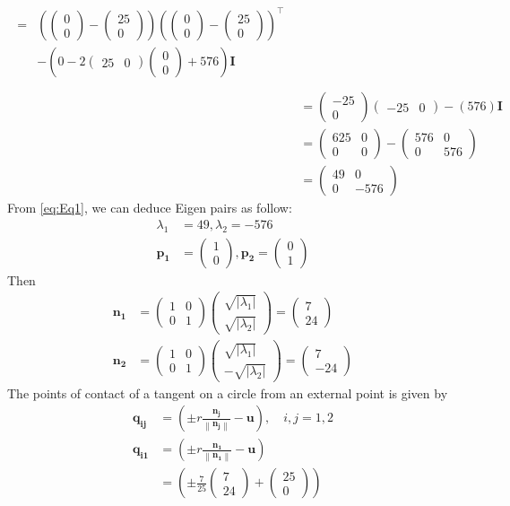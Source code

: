 \documentclass[12pt]{article}
\providecommand{\brak}[1]{\ensuremath{\left(#1\right)}}
\providecommand{\norm}[1]{\left\lVert#1\right\rVert}
\providecommand{\abs}[1]{\left\vert#1\right\vert}
\newcommand{\myvec}[1]{\ensuremath{\begin{pmatrix}#1\end{pmatrix}}}
\let\vec\mathbf
\begin{document}
\begin{enumerate}
\begin{align}
\end{align}
\begin{align}
  \begin{split}
	={}& \brak{\myvec{0\\0}-\myvec{25\\0}}\brak{\myvec{0\\0}-\myvec{25\\0}}^\top \\
	   & -\brak{0-2\myvec{25&0}\myvec{0 \\0}+576}\vec{I}\\ 
  \end{split}\\
	&= \myvec{-25\\0}\myvec{-25&0} - \brak{576}\vec{I} \\ 
	&= \myvec{625&0\\0&0 } - \myvec{576&0\\0&576} \\ 
        \label{eq:Eq1}
	&= \myvec{49&0\\0&-576 } 
\end{align}
From \eqref{eq:Eq1}, we can deduce Eigen pairs as follow: 
\begin{align}
	\lambda_1 &= 49 , \lambda_2 = -576 \\
	\vec{p_1} &= \myvec{1\\0} , \vec{p_2} = \myvec{0\\1}
\end{align}
Then
\begin{align}
	\vec{n_1} &= \myvec{1&0\\0&1}\myvec{\sqrt{\abs{\lambda_1}} \\ \sqrt{\abs{\lambda_2}}} = \myvec{7\\24} \\
	\vec{n_2} &= \myvec{1&0\\0&1}\myvec{\sqrt{\abs{\lambda_1}} \\ -\sqrt{\abs{\lambda_2}}} = \myvec{7\\-24}
\end{align}
The points of contact of a tangent on a circle from an external point is given by 
\begin{align}
	\vec{q_{ij}} &= \brak{\pm r \frac{\vec{n_j}}{\norm{\vec{n_j}}}- \vec{u}},  \quad i,j = 1,2 \\
	\vec{q_{i1}} &= \brak{\pm r \frac{\vec{n_1}}{\norm{\vec{n_1}}}- \vec{u}} \\
	&= \brak{\pm \frac{7}{25}\myvec{7\\24}+ \myvec{25\\0}} \\

\end{align}
\end{enumerate}
\end{document}
